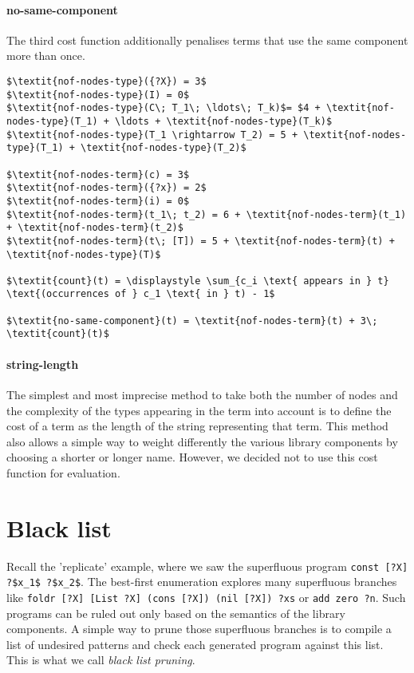   \paragraph{no-same-component}
The third cost function additionally penalises terms that use the same component more than once.
%
\begin{lstlisting}[style=algorithm]
$\textit{nof-nodes-type}({?X}) = 3$
$\textit{nof-nodes-type}(I) = 0$
$\textit{nof-nodes-type}(C\; T_1\; \ldots\; T_k)$= $4 + \textit{nof-nodes-type}(T_1) + \ldots + \textit{nof-nodes-type}(T_k)$
$\textit{nof-nodes-type}(T_1 \rightarrow T_2) = 5 + \textit{nof-nodes-type}(T_1) + \textit{nof-nodes-type}(T_2)$

$\textit{nof-nodes-term}(c) = 3$
$\textit{nof-nodes-term}({?x}) = 2$
$\textit{nof-nodes-term}(i) = 0$
$\textit{nof-nodes-term}(t_1\; t_2) = 6 + \textit{nof-nodes-term}(t_1) + \textit{nof-nodes-term}(t_2)$
$\textit{nof-nodes-term}(t\; [T]) = 5 + \textit{nof-nodes-term}(t) + \textit{nof-nodes-type}(T)$

$\textit{count}(t) = \displaystyle \sum_{c_i \text{ appears in } t} \text{(occurrences of } c_1 \text{ in } t) - 1$

$\textit{no-same-component}(t) = \textit{nof-nodes-term}(t) + 3\; \textit{count}(t)$
\end{lstlisting}

  \paragraph{string-length}
The simplest and most imprecise method to take both the number of nodes and the complexity of the types appearing in the term into account is to define the cost of a term as the length of the string representing that term. This method also allows a simple way to weight differently the various library components by choosing a shorter or longer name. However, we decided not to use this cost function for evaluation.

\section{Black list}\label{Black list}
Recall the 'replicate' example, where we saw the superfluous program \lstinline!const [?X] ?$x_1$ ?$x_2$!. The best-first enumeration explores many superfluous branches like \lstinline!foldr [?X] [List ?X] (cons [?X]) (nil [?X]) ?xs! or \lstinline!add zero ?n!. Such programs can be ruled out only based on the semantics of the library components. A simple way to prune those superfluous branches is to compile a list of undesired patterns and check each generated program against this list. This is what we call \emph{black list pruning}.

